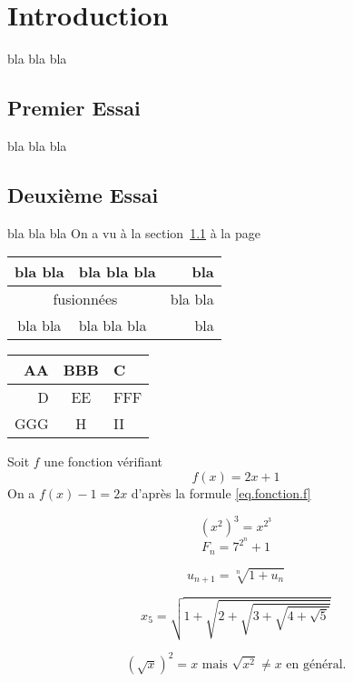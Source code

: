 \documentclass[a4paper,10pt]{scrartcl}
\begin{document}
\section{Introduction}
bla bla bla
\subsection{Premier Essai}\label{subsec.toto}
bla bla bla
\subsection{Deuxième Essai}
bla bla bla
On a vu à la section~\ref{subsec.toto} à la page~\pageref{subsec.toto}

\begin{center}
\begin{tabular}{|clr|}
\hline
bla bla & bla bla bla & bla       \\
\hline
\multicolumn{2}{|c}{fusionnées} & bla bla \\
\hline
bla bla & bla bla bla & bla       \\
\hline
\end{tabular}
\end{center}

\begin{tabular}{|r|c|l|}
\hline
AA  &   BBB &   C\\
\hline
D   &   EE  &   FFF\\
GGG &   H   &   II\\
\hline
\end{tabular}

\begin{multicols}{2}
\lipsum[1]
\begin{multicols}{2}
\lipsum[2]
\end{multicols}
\lipsum[3]
\end{multicols}

Soit $f$ une fonction vérifiant
\begin{equation}\label{eq.fonction.f}
f(x) = 2x + 1    
\end{equation}
On a $f(x) - 1 = 2x$ d'après la formule \eqref{eq.fonction.f}

\[
    (x^2)^3 = x^{2^3}\]
\[
    F_n = 7^{2^n} + 1\]

\[
    u_{n+1} = \sqrt[n]{1+u_n}
    \]

\[
    x_{5} = \sqrt{1+\sqrt{2+\sqrt{3+\sqrt{4+\sqrt{5}}}}}
    \]

\[
    (\sqrt{x})^2 = x \text{ mais }  \sqrt{x^2} \neq x   \text{ en général.}
    \]
\end{document}
